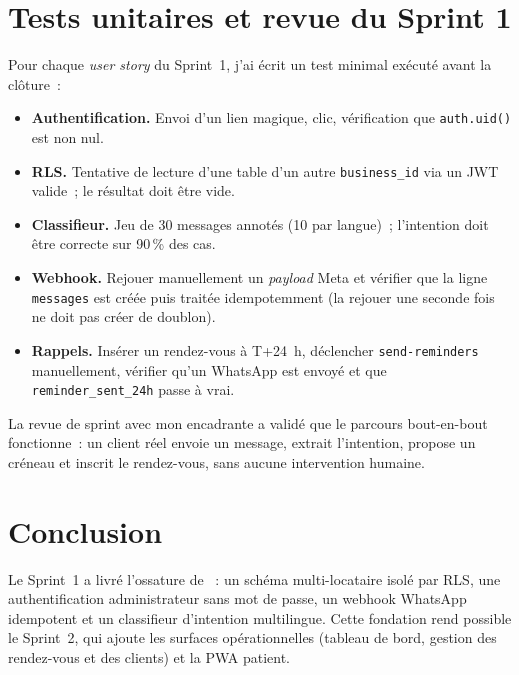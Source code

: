 \section{Tests unitaires et revue du Sprint 1}
Pour chaque \emph{user story} du Sprint~1, j'ai écrit un test
minimal exécuté avant la clôture~:
\begin{itemize}
  \item \textbf{Authentification.} Envoi d'un lien magique, clic,
        vérification que \texttt{auth.uid()} est non nul.
  \item \textbf{RLS.} Tentative de lecture d'une table d'un autre
        \texttt{business\_id} via un JWT valide~; le résultat doit
        être vide.
  \item \textbf{Classifieur.} Jeu de 30 messages annotés (10 par
        langue)~; l'intention doit être correcte sur 90\,\% des
        cas.
  \item \textbf{Webhook.} Rejouer manuellement un \emph{payload}
        Meta et vérifier que la ligne \texttt{messages} est créée
        puis traitée idempotemment (la rejouer une seconde fois
        ne doit pas créer de doublon).
  \item \textbf{Rappels.} Insérer un rendez-vous à T+24~h,
        déclencher \texttt{send-reminders} manuellement, vérifier
        qu'un WhatsApp est envoyé et que
        \texttt{reminder\_sent\_24h} passe à vrai.
\end{itemize}

La revue de sprint avec mon encadrante a validé que le parcours
bout-en-bout fonctionne~: un client réel envoie un message, \nova{}
extrait l'intention, propose un créneau et inscrit le rendez-vous,
sans aucune intervention humaine.

\section{Conclusion}
Le Sprint~1 a livré l'ossature de \nova{}~: un schéma
multi-locataire isolé par RLS, une authentification administrateur
sans mot de passe, un webhook WhatsApp idempotent et un
classifieur d'intention multilingue. Cette fondation rend possible
le Sprint~2, qui ajoute les surfaces opérationnelles (tableau de
bord, gestion des rendez-vous et des clients) et la PWA patient.
